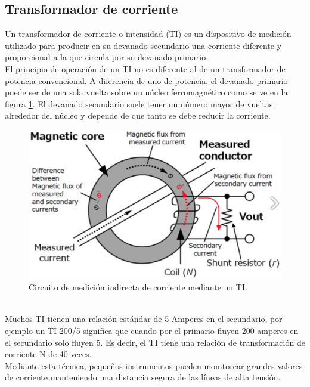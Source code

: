 \subsection{Transformador de corriente}
Un transformador de corriente o intensidad (TI) es un dispositivo de medición utilizado para producir en su devanado secundario una corriente diferente y proporcional a la que circula por su devanado primario.\\
El principio de operación de un TI no es diferente al de un transformador de potencia convencional. A diferencia de uno de potencia, el devanado primario puede ser de una sola vuelta sobre un núcleo ferromagnético como se ve en la figura \ref{fig:dibujomedicionti}. El devanado secundario suele tener un número mayor de vueltas alrededor del núcleo y depende de que tanto se debe reducir la corriente.\\
\begin{figure}[h!]
	\centering
	\includegraphics[width=0.5\linewidth]{Figures/dibujo_medicion_TI}
	\caption{Circuito de medición indirecta de corriente mediante un TI.\citep{hioki}}
	\label{fig:dibujomedicionti}
\end{figure}\\
Muchos TI tienen una relación estándar de 5 Amperes en el secundario, por ejemplo un TI 200/5 significa que cuando por el primario fluyen 200 amperes en el secundario solo fluyen 5. Es decir, el TI tiene una relación de transformación de corriente N de 40 veces.\\
Mediante esta técnica, pequeños instrumentos pueden monitorear grandes valores de corriente manteniendo una distancia segura de las líneas de alta tensión.


